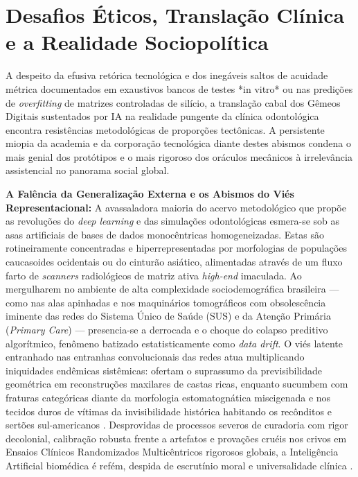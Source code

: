 \section{Desafios Éticos, Translação Clínica e a Realidade Sociopolítica}
\label{sec:ia-desafios}

A despeito da efusiva retórica tecnológica e dos inegáveis saltos de acuidade métrica documentados em exaustivos bancos de testes *in vitro* ou nas predições de \textit{overfitting} de matrizes controladas de silício, a translação cabal dos Gêmeos Digitais sustentados por IA na realidade pungente da clínica odontológica encontra resistências metodológicas de proporções tectônicas. A persistente miopia da academia e da corporação tecnológica diante destes abismos condena o mais genial dos protótipos e o mais rigoroso dos oráculos mecânicos à irrelevância assistencial no panorama social global.

\textbf{A Falência da Generalização Externa e os Abismos do Viés Representacional:} A avassaladora maioria do acervo metodológico que propõe as revoluções do \textit{deep learning} e das simulações odontológicas esmera-se sob as asas artificiais de bases de dados monocêntricas homogeneizadas. Estas são rotineiramente concentradas e hiperrepresentadas por morfologias de populações caucasoides ocidentais ou do cinturão asiático, alimentadas através de um fluxo farto de \textit{scanners} radiológicos de matriz ativa \textit{high-end} imaculada. Ao mergulharem no ambiente de alta complexidade sociodemográfica brasileira --- como nas alas apinhadas e nos maquinários tomográficos com obsolescência iminente das redes do Sistema Único de Saúde (SUS) e da Atenção Primária (\textit{Primary Care}) --- presencia-se a derrocada e o choque do colapso preditivo algorítmico, fenômeno batizado estatisticamente como \textit{data drift}. O viés latente entranhado nas entranhas convolucionais das redes atua multiplicando iniquidades endêmicas sistêmicas: ofertam o suprassumo da previsibilidade geométrica em reconstruções maxilares de castas ricas, enquanto sucumbem com fraturas categóricas diante da morfologia estomatognática miscigenada e nos tecidos duros de vítimas da invisibilidade histórica habitando os recônditos e sertões sul-americanos \cite{cuadros2023assessing}. Desprovidas de processos severos de curadoria com rigor decolonial, calibração robusta frente a artefatos e provações cruéis nos crivos em Ensaios Clínicos Randomizados Multicêntricos rigorosos globais, a Inteligência Artificial biomédica é refém, despida de escrutínio moral e universalidade clínica \cite{duggal2026exploring}.

